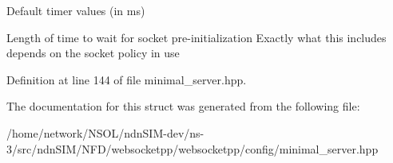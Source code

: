 Default timer values (in ms) 

Length of time to wait for socket pre-\/initialization Exactly what this includes depends on the socket policy in use 

Definition at line 144 of file minimal\+\_\+server.\+hpp.



The documentation for this struct was generated from the following file\+:\begin{DoxyCompactItemize}
\item 
/home/network/\+N\+S\+O\+L/ndn\+S\+I\+M-\/dev/ns-\/3/src/ndn\+S\+I\+M/\+N\+F\+D/websocketpp/websocketpp/config/minimal\+\_\+server.\+hpp\end{DoxyCompactItemize}
